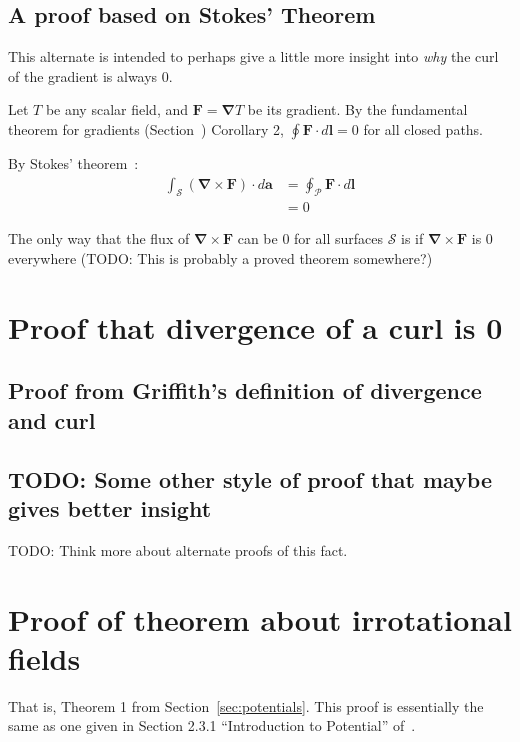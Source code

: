 \documentclass[a4paper]{article}
\theoremstyle{plain}
\theoremstyle{definition}
\newcommand{\vect}[1]{\textbf{#1}}
\newcommand{\del}{\bm{\nabla}}
\begin{document}
\subsection{A proof based on Stokes' Theorem}

This alternate is intended to perhaps give a little more insight into
{\em why} the curl of the gradient is always 0.

Let $T$ be any scalar field, and $\vect{F} = \del T$ be its gradient.
By the fundamental theorem for gradients (Section~\cite{sec:ftocgrad})
Corollary 2, $\oint \vect{F} \cdot d\vect{l} = 0$ for all closed
paths.

By Stokes' theorem~\cite{sec:stokesthm}:
\begin{align*}
\int_{\mathcal{S}} (\del \times \vect{F}) \cdot d\vect{a} & = \oint_{\mathcal{P}} \vect{F} \cdot d\vect{l} \\
   & = 0
\end{align*}

The only way that the flux of $\del \times \vect{F}$ can be 0 for all
surfaces $\mathcal{S}$ is if $\del \times \vect{F}$ is 0 everywhere
(TODO: This is probably a proved theorem somewhere?)


\section{Proof that divergence of a curl is 0}
\label{sec:divofcurlis0}

\subsection{Proof from Griffith's definition of divergence and curl}


\subsection{TODO: Some other style of proof that maybe gives better insight}

TODO: Think more about alternate proofs of this fact.


\section{Proof of theorem about irrotational fields}
\label{sec:potentialsthm1}

That is, Theorem 1 from Section~\ref{sec:potentials}.  This proof is
essentially the same as one given in Section 2.3.1 ``Introduction to
Potential'' of~\cite{Griffiths1998}.
\end{document}
